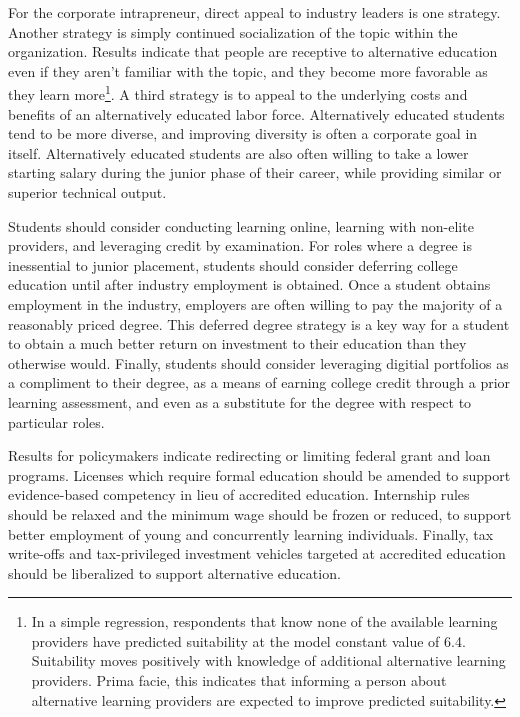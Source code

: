 \documentclass[AER]{./aea-latex-templates/AEA}
\begin{document}
        For the corporate intrapreneur, direct appeal to industry leaders is one strategy.
        Another strategy is simply continued socialization of the topic within the organization.
        Results indicate that people are receptive to alternative education even if they aren’t
        familiar with the topic, and they become more favorable as they learn
        more\footnote{In a simple regression, respondents that know none of the available learning providers have predicted suitability at the model constant value of 6.4.
        Suitability moves positively with knowledge of additional alternative learning providers.
        Prima facie, this indicates that informing a person about alternative learning providers are expected to improve predicted suitability.}.
        A third strategy is to appeal to the underlying costs and benefits of an alternatively educated labor force.
        Alternatively educated students tend to be more diverse\cite{florentine_2018}, and improving diversity is often a corporate goal in itself.
        Alternatively educated students are also often willing to take a lower starting salary during the junior phase of their career, while providing similar or superior technical output.
        
        Students should consider conducting learning online, learning with non-elite providers,
        and leveraging credit by examination.
        For roles where a degree is inessential to junior placement, students should consider
        deferring college education until after industry employment is obtained.
        Once a student obtains employment in the industry, employers are often willing to pay the majority of a reasonably priced degree.
        This deferred degree strategy is a key way for a student to obtain a much better return on investment to their education than they otherwise would.
        Finally, students should consider leveraging digitial portfolios as a compliment to their degree,
        as a means of earning college credit through a prior learning assessment,
        and even as a substitute for the degree with respect to particular roles.
        
        Results for policymakers indicate redirecting or limiting federal grant and loan programs.
        Licenses which require formal education should be amended to support evidence-based competency in lieu of accredited education.
        Internship rules should be relaxed and the minimum wage should be frozen or reduced,
        to support better employment of young and concurrently learning individuals.
        Finally, tax write-offs and tax-privileged
        investment vehicles targeted at accredited education should be liberalized
        to support alternative education.
        
        
        
        
        
\end{document}

